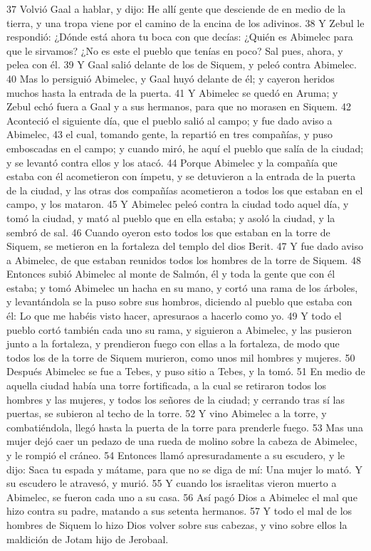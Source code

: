 37 Volvió Gaal a hablar, y dijo: He allí gente que desciende de en medio de la tierra, y una tropa viene por el camino de la encina de los adivinos.
38 Y Zebul le respondió: ¿Dónde está ahora tu boca con que decías: ¿Quién es Abimelec para que le sirvamos? ¿No es este el pueblo que tenías en poco? Sal pues, ahora, y pelea con él.
39 Y Gaal salió delante de los de Siquem, y peleó contra Abimelec.
40 Mas lo persiguió Abimelec, y Gaal huyó delante de él; y cayeron heridos muchos hasta la entrada de la puerta.
41 Y Abimelec se quedó en Aruma; y Zebul echó fuera a Gaal y a sus hermanos, para que no morasen en Siquem.
42 Aconteció el siguiente día, que el pueblo salió al campo; y fue dado aviso a Abimelec,
43 el cual, tomando gente, la repartió en tres compañías, y puso emboscadas en el campo; y cuando miró, he aquí el pueblo que salía de la ciudad; y se levantó contra ellos y los atacó.
44 Porque Abimelec y la compañía que estaba con él acometieron con ímpetu, y se detuvieron a la entrada de la puerta de la ciudad, y las otras dos compañías acometieron a todos los que estaban en el campo, y los mataron.
45 Y Abimelec peleó contra la ciudad todo aquel día, y tomó la ciudad, y mató al pueblo que en ella estaba; y asoló la ciudad, y la sembró de sal.
46 Cuando oyeron esto todos los que estaban en la torre de Siquem, se metieron en la fortaleza del templo del dios Berit.
47 Y fue dado aviso a Abimelec, de que estaban reunidos todos los hombres de la torre de Siquem.
48 Entonces subió Abimelec al monte de Salmón, él y toda la gente que con él estaba; y tomó Abimelec un hacha en su mano, y cortó una rama de los árboles, y levantándola se la puso sobre sus hombros, diciendo al pueblo que estaba con él: Lo que me habéis visto hacer, apresuraos a hacerlo como yo.
49 Y todo el pueblo cortó también cada uno su rama, y siguieron a Abimelec, y las pusieron junto a la fortaleza, y prendieron fuego con ellas a la fortaleza, de modo que todos los de la torre de Siquem murieron, como unos mil hombres y mujeres.
50 Después Abimelec se fue a Tebes, y puso sitio a Tebes, y la tomó.
51 En medio de aquella ciudad había una torre fortificada, a la cual se retiraron todos los hombres y las mujeres, y todos los señores de la ciudad; y cerrando tras sí las puertas, se subieron al techo de la torre.
52 Y vino Abimelec a la torre, y combatiéndola, llegó hasta la puerta de la torre para prenderle fuego.
53 Mas una mujer dejó caer un pedazo de una rueda de molino sobre la cabeza de Abimelec, y le rompió el cráneo.
54 Entonces llamó apresuradamente a su escudero, y le dijo: Saca tu espada y mátame, para que no se diga de mí: Una mujer lo mató. Y su escudero le atravesó, y murió.
55 Y cuando los israelitas vieron muerto a Abimelec, se fueron cada uno a su casa.
56 Así pagó Dios a Abimelec el mal que hizo contra su padre, matando a sus setenta hermanos.
57 Y todo el mal de los hombres de Siquem lo hizo Dios volver sobre sus cabezas, y vino sobre ellos la maldición de Jotam hijo de Jerobaal.

